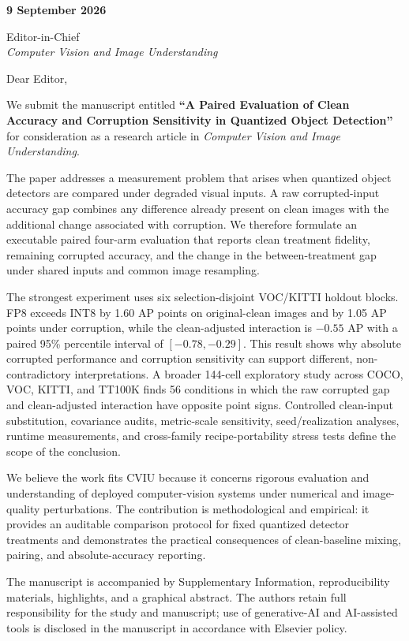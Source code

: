 \documentclass[11pt]{article}
\begin{document}
\thispagestyle{empty}

\textbf{9 September 2026}

Editor-in-Chief\\
\textit{Computer Vision and Image Understanding}

Dear Editor,

We submit the manuscript entitled \textbf{``A Paired Evaluation of Clean Accuracy and Corruption Sensitivity in Quantized Object Detection''} for consideration as a research article in \textit{Computer Vision and Image Understanding}.

The paper addresses a measurement problem that arises when quantized object detectors are compared under degraded visual inputs. A raw corrupted-input accuracy gap combines any difference already present on clean images with the additional change associated with corruption. We therefore formulate an executable paired four-arm evaluation that reports clean treatment fidelity, remaining corrupted accuracy, and the change in the between-treatment gap under shared inputs and common image resampling.

The strongest experiment uses six selection-disjoint VOC/KITTI holdout blocks. FP8 exceeds INT8 by 1.60 AP points on original-clean images and by 1.05 AP points under corruption, while the clean-adjusted interaction is $-0.55$ AP with a paired 95\% percentile interval of $[-0.78,-0.29]$. This result shows why absolute corrupted performance and corruption sensitivity can support different, non-contradictory interpretations. A broader 144-cell exploratory study across COCO, VOC, KITTI, and TT100K finds 56 conditions in which the raw corrupted gap and clean-adjusted interaction have opposite point signs. Controlled clean-input substitution, covariance audits, metric-scale sensitivity, seed/realization analyses, runtime measurements, and cross-family recipe-portability stress tests define the scope of the conclusion.

We believe the work fits CVIU because it concerns rigorous evaluation and understanding of deployed computer-vision systems under numerical and image-quality perturbations. The contribution is methodological and empirical: it provides an auditable comparison protocol for fixed quantized detector treatments and demonstrates the practical consequences of clean-baseline mixing, pairing, and absolute-accuracy reporting.

The manuscript is accompanied by Supplementary Information, reproducibility materials, highlights, and a graphical abstract. The authors retain full responsibility for the study and manuscript; use of generative-AI and AI-assisted tools is disclosed in the manuscript in accordance with Elsevier policy.
\end{document}
